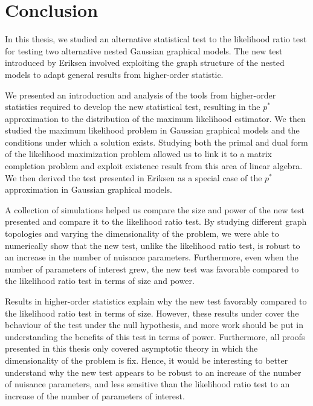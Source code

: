 \section{Conclusion}

In this thesis, we studied an alternative statistical test to the likelihood ratio test for testing two alternative nested Gaussian graphical models. The new test introduced by Eriksen \cite{eriksen1996tests} involved exploiting the graph structure of the nested models to adapt general results from higher-order statistic.

We presented an introduction and analysis of the tools from higher-order statistics required to develop the new statistical test, resulting in the $p^*$ approximation to the distribution of the maximum likelihood estimator. We then studied the maximum likelihood problem in Gaussian graphical models and the conditions under which a solution exists. Studying both the primal and dual form of the likelihood maximization problem allowed us to link it to a matrix completion problem and exploit existence result from this area of linear algebra. We then derived the test presented in Eriksen \cite{eriksen1996tests} as a special case of the $p^*$ approximation in Gaussian graphical models.

A collection of simulations helped us compare the size and power of the new test presented and compare it to the likelihood ratio test. By studying different graph topologies and varying the dimensionality of the problem, we were able to numerically show that the new test, unlike the likelihood ratio test, is robust to an increase in the number of nuisance parameters. Furthermore, even when the number of parameters of interest grew, the new test was favorable compared to the likelihood ratio test in terms of size and power.

Results in higher-order statistics explain why the new test favorably compared to the likelihood ratio test in terms of size. However, these results under cover the behaviour of the test under the null hypothesis, and more work should be put in understanding the benefits of this test in terms of power. Furthermore, all proofs presented in this thesis only covered asymptotic theory in which the dimensionality of the problem is fix. Hence, it would be interesting to better understand why the new test appears to be robust to an increase of the number of nuisance parameters, and less sensitive than the likelihood ratio test to an increase of the number of parameters of interest. 